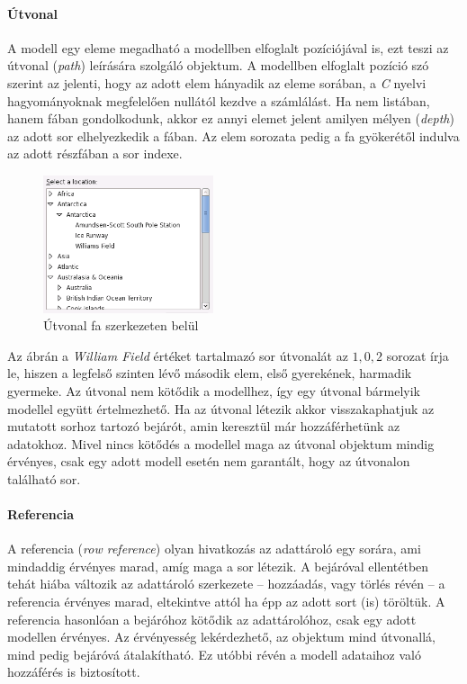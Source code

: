 \paragraph{Útvonal}

A modell egy eleme megadható a modellben elfoglalt pozíciójával is, ezt teszi az útvonal (\textit{path}) leírására szolgáló objektum. A modellben elfoglalt pozíció szó szerint az jelenti, hogy az adott elem hányadik az eleme sorában, a \textit{C} nyelvi hagyományoknak megfelelően nullától kezdve a számlálást. Ha nem listában, hanem fában gondolkodunk, akkor ez annyi elemet jelent amilyen mélyen (\textit{depth}) az adott sor elhelyezkedik a fában. Az elem sorozata pedig a fa gyökerétől indulva az adott részfában a sor indexe.

\begin{figure}[h]
\begin{center}
\includegraphics[width=50mm]{images/tree.png}
\caption{Útvonal fa szerkezeten belül\cite{gnomehig}}
\end{center}
\end{figure}

Az ábrán a \textit{William Field} értéket tartalmazó sor útvonalát az $1, 0, 2$ sorozat írja le, hiszen a legfelső szinten lévő második elem, első gyerekének, harmadik gyermeke. Az útvonal nem kötődik a modellhez, így egy útvonal bármelyik modellel együtt értelmezhető. Ha az útvonal létezik akkor visszakaphatjuk az mutatott sorhoz tartozó bejárót, amin keresztül már hozzáférhetünk az adatokhoz. Mivel nincs kötődés a modellel maga az útvonal objektum mindig érvényes, csak egy adott modell esetén nem garantált, hogy az útvonalon található sor.

\paragraph{Referencia}

A referencia (\textit{row reference}) olyan hivatkozás az adattároló egy sorára, ami mindaddig érvényes marad, amíg maga a sor létezik. A bejáróval ellentétben tehát hiába változik az adattároló szerkezete -- hozzáadás, vagy törlés révén -- a referencia érvényes marad, eltekintve attól ha épp az adott sort (is) töröltük. A referencia hasonlóan a bejáróhoz kötődik az adattárolóhoz, csak egy adott modellen érvényes. Az érvényesség lekérdezhető, az objektum mind útvonallá, mind pedig bejáróvá átalakítható. Ez utóbbi révén a modell adataihoz való hozzáférés is biztosított.

